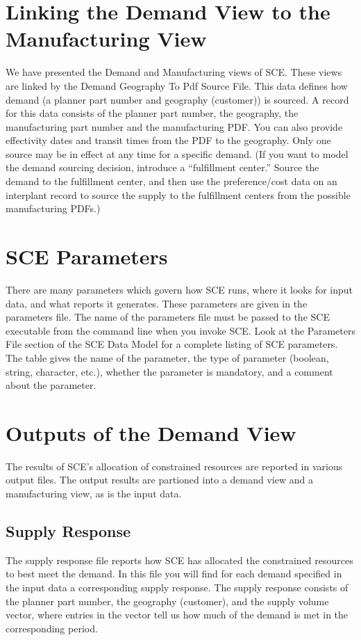 \section{Linking the Demand View to the Manufacturing View}
We have presented the Demand and Manufacturing views of SCE.  These
views are linked by the Demand Geography To Pdf Source File.  This
data defines how demand (a planner part number and geography
(customer)) is sourced.  A record for this data consists of the
planner part number, the geography, the manufacturing part number and
the manufacturing PDF.  You can also provide effectivity dates and
transit times from the PDF to the geography.  Only one source may be
in effect at any time for a specific demand.  (If you want to model
the demand sourcing decision, introduce a ``fulfillment center.''
Source the demand to the fulfillment center, and then use the
preference/cost data on an interplant record to source the supply to
the fulfillment centers from the possible manufacturing PDFs.)

\section{SCE Parameters}
There are many parameters which govern how SCE runs, where it looks
for input data, and what reports it generates.  These parameters are
given in the parameters file.  The name of the parameters file must be
passed to the SCE executable from the command line when you invoke
SCE.  Look at the Parameters File section of the SCE Data Model for a
complete listing of SCE parameters.  The table gives the name of the
parameter, the type of parameter (boolean, string, character, etc.),
whether the parameter is mandatory, and a comment about the parameter.
 
\section{Outputs of the Demand View}
The results of SCE's allocation of constrained resources are reported
in various output files.  The output results are partioned into a
demand view and a manufacturing view, as is the input data.

\subsection{Supply Response}
The supply response file reports how SCE has allocated the constrained
resources to best meet the demand.  In this file you will find for
each demand specified in the input data a corresponding supply
response.  The supply response consists of the planner part number,
the geography (customer), and the supply volume vector, where entries
in the vector tell us how much of the demand is met in the
corresponding period.

